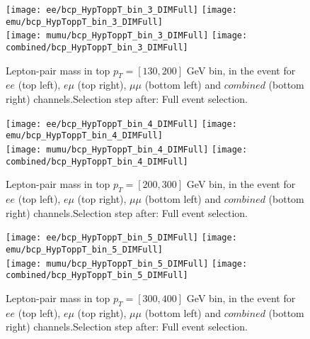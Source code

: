 \clearpage
\newpage


\begin{figure}
  \texttt{[image: ee/bcp\_HypToppT\_bin\_3\_DIMFull]}
  \texttt{[image: emu/bcp\_HypToppT\_bin\_3\_DIMFull]}\\
  \texttt{[image: mumu/bcp\_HypToppT\_bin\_3\_DIMFull]}
  \texttt{[image: combined/bcp\_HypToppT\_bin\_3\_DIMFull]}
\caption{Lepton-pair mass in top $p_T = [130,200]$ GeV bin, in the event for $ee$ (top left), $e\mu$ (top right), $\mu\mu$ (bottom left) and $combined$ (bottom right) channels.\newline Selection step after: Full event selection.}
\end{figure}

\clearpage
\newpage

\begin{figure}
  \texttt{[image: ee/bcp\_HypToppT\_bin\_4\_DIMFull]}
  \texttt{[image: emu/bcp\_HypToppT\_bin\_4\_DIMFull]}\\
  \texttt{[image: mumu/bcp\_HypToppT\_bin\_4\_DIMFull]}
  \texttt{[image: combined/bcp\_HypToppT\_bin\_4\_DIMFull]}
\caption{Lepton-pair mass in top $p_T = [200,300]$ GeV bin, in the event for $ee$ (top left), $e\mu$ (top right), $\mu\mu$ (bottom left) and $combined$ (bottom right) channels.\newline Selection step after: Full event selection.}
\end{figure}

\clearpage
\newpage


\begin{figure}
  \texttt{[image: ee/bcp\_HypToppT\_bin\_5\_DIMFull]}
  \texttt{[image: emu/bcp\_HypToppT\_bin\_5\_DIMFull]}\\
  \texttt{[image: mumu/bcp\_HypToppT\_bin\_5\_DIMFull]}
  \texttt{[image: combined/bcp\_HypToppT\_bin\_5\_DIMFull]}
\caption{Lepton-pair mass in top $p_T = [300,400]$ GeV bin, in the event for $ee$ (top left), $e\mu$ (top right), $\mu\mu$ (bottom left) and $combined$ (bottom right) channels.\newline Selection step after: Full event selection.}
\end{figure}

\clearpage
\newpage

